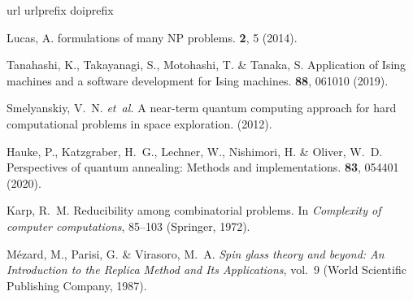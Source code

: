 \documentclass[fleqn,10pt]{wlscirep}
\begin{document}
\begin{thebibliography}{100}
\expandafter\ifx\csname url\endcsname\relax
  \def\url#1{\texttt{#1}}\fi
\expandafter\ifx\csname urlprefix\endcsname\relax\def\urlprefix{URL }\fi
\expandafter\ifx\csname doiprefix\endcsname\relax\def\doiprefix{DOI: }\fi
\providecommand{\bibinfo}[2]{#2}
\providecommand{\eprint}[2][]{\url{#2}}

\bibinfo{author}{Lucas, A.}
\newblock \bibinfo{journal}{\bibinfo{title}{{Ising} formulations of many {NP}
  problems}}.
  \textbf{\bibinfo{volume}{2}}, \bibinfo{pages}{5} (\bibinfo{year}{2014}).

\bibinfo{author}{Tanahashi, K.}, \bibinfo{author}{Takayanagi, S.},
  \bibinfo{author}{Motohashi, T.} \& \bibinfo{author}{Tanaka, S.}
\newblock \bibinfo{journal}{\bibinfo{title}{Application of {Ising} machines and
  a software development for {Ising} machines}}.
  \textbf{\bibinfo{volume}{88}}, \bibinfo{pages}{061010}
  (\bibinfo{year}{2019}).

\bibinfo{author}{Smelyanskiy, V.~N.} \emph{et~al.}
\newblock \bibinfo{journal}{\bibinfo{title}{A near-term quantum computing
  approach for hard computational problems in space exploration}}.
  (\bibinfo{year}{2012}).

\bibinfo{author}{Hauke, P.}, \bibinfo{author}{Katzgraber, H.~G.},
  \bibinfo{author}{Lechner, W.}, \bibinfo{author}{Nishimori, H.} \&
  \bibinfo{author}{Oliver, W.~D.}
\newblock \bibinfo{journal}{\bibinfo{title}{Perspectives of quantum annealing:
  Methods and implementations}}.
  \textbf{\bibinfo{volume}{83}}, \bibinfo{pages}{054401}
  (\bibinfo{year}{2020}).

\bibinfo{author}{Karp, R.~M.}
\newblock \bibinfo{title}{Reducibility among combinatorial problems}.
\newblock In \emph{\bibinfo{booktitle}{Complexity of computer computations}},
  \bibinfo{pages}{85--103} (\bibinfo{publisher}{Springer},
  \bibinfo{year}{1972}).

\bibinfo{author}{M{\'e}zard, M.}, \bibinfo{author}{Parisi, G.} \&
  \bibinfo{author}{Virasoro, M.~A.}
\newblock \emph{\bibinfo{title}{Spin glass theory and beyond: An Introduction
  to the Replica Method and Its Applications}}, vol.~\bibinfo{volume}{9}
  (\bibinfo{publisher}{World Scientific Publishing Company},
  \bibinfo{year}{1987}).


\end{thebibliography}
\end{document}
